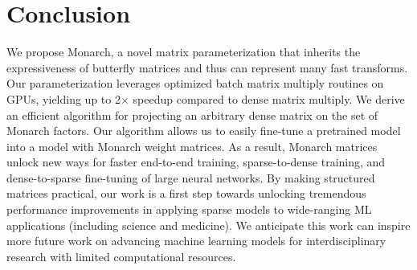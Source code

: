 \section{Conclusion}
\label{sec:conclusion}
We propose Monarch, a novel matrix parameterization that inherits the expressiveness of butterfly matrices and thus can represent many fast transforms.
Our parameterization leverages optimized batch matrix multiply routines on GPUs, yielding up to 2$\times$ speedup compared to dense matrix multiply.
We derive an efficient algorithm for projecting an arbitrary dense matrix on the set of Monarch factors.
Our algorithm allows us to easily fine-tune a pretrained model into a model with Monarch weight matrices.
As a result, Monarch matrices unlock new ways for faster end-to-end training, sparse-to-dense training, and dense-to-sparse fine-tuning of large neural networks.
By making structured matrices practical, our work is a first step towards unlocking tremendous performance improvements in applying sparse models to wide-ranging ML applications (including science and medicine).
We anticipate this work can inspire more future work on advancing machine learning models for interdisciplinary research with limited computational resources.

